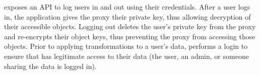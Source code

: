 %
\syscrypt exposes an API to log users in and out using their credentials.
%
After a user logs in, the application gives the proxy their private key, thus
allowing decryption of their accessible objects.
%
Logging out deletes the user's private key from the proxy and re-encrypts their
object keys, thus preventing the proxy from accessing those objects.
%
Prior to applying transformations to a user's data, \syscrypt performs a login to
ensure that \syscrypt has legitimate access to their data (\eg the user, an admin, or
someone sharing the data is logged in).
%
%


%
%

